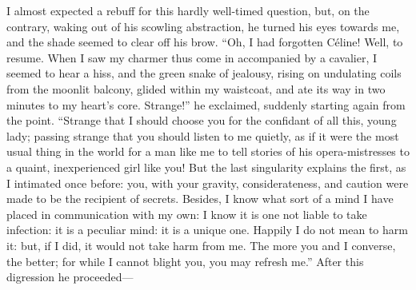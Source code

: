 I almost expected a rebuff for this hardly well-timed question, but, on
the contrary, waking out of his scowling abstraction, he turned his eyes
towards me, and the shade seemed to clear off his brow. \enquote{Oh, I
had forgotten Céline! Well, to resume. When I saw my charmer thus come
in accompanied by a cavalier, I seemed to hear a hiss, and the green
snake of jealousy, rising on undulating coils from the moonlit balcony,
glided within my waistcoat, and ate its way in two minutes to my heart's
core. Strange!} he exclaimed, suddenly starting again from the point. 
\enquote{Strange that I should choose you for the confidant of all this,
young lady; passing strange that you should listen to me quietly, as if
it were the most usual thing in the world for a man like me to tell
stories of his opera-mistresses to a quaint, inexperienced girl like
you! But the last singularity explains the first, as I intimated once
before: you, with your gravity, considerateness, and caution were made
to be the recipient of secrets. Besides, I know what sort of a mind I
have placed in communication with my own: I know it is one not liable to
take infection: it is a peculiar mind: it is a unique one. Happily I do
not mean to harm it: but, if I did, it would not take harm from me. The
more you and I converse, the better; for while I cannot blight you, you
may refresh me.} After this digression he proceeded---

